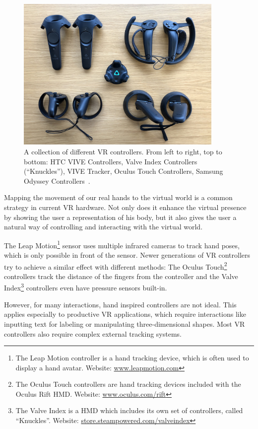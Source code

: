 \begin{figure}[H]%
	\centering%
	\includegraphics[width=10cm]{figures/introduction/vr_controllers.jpg}%
	\caption[Collection of VR controllers]{A collection of different \gls{VR} controllers. From left to right, top to bottom: HTC VIVE Controllers, Valve Index Controllers (\enquote{Knuckles}), VIVE Tracker, Oculus Touch Controllers, Samsung Odyssey Controllers~\cite{Yang.2018}.}\label{fig:vr-controllers}
\end{figure}

Mapping the movement of our real hands to the virtual world is a common strategy in current \gls{VR} hardware. Not only does it enhance the virtual presence by showing the user a representation of his body, but it also gives the user a natural way of controlling and interacting with the virtual world.

The Leap Motion\footnote{The Leap Motion controller is a hand tracking device, which is often used to display a hand avatar. Website: \href{https://www.leapmotion.com/}{www.leapmotion.com}} sensor uses multiple infrared cameras to track hand poses, which is only possible in front of the sensor. Newer generations of \gls{VR} controllers try to achieve a similar effect with different methods: The Oculus Touch\footnote{The Oculus Touch controllers are hand tracking devices included with the Oculus Rift \gls{HMD}. Website: \href{https://www.oculus.com/rift/}{www.oculus.com/rift}} controllers track the distance of the fingers from the controller and the Valve Index\footnote{The Valve Index is a \gls{HMD} which includes its own set of controllers, called \enquote{Knuckles}. Website: \href{https://store.steampowered.com/valveindex}{store.steampowered.com/valveindex}} controllers even have pressure sensors built-in.

However, for many interactions, hand inspired controllers are not ideal. This applies especially to productive \gls{VR} applications, which require interactions like inputting text for labeling or manipulating three-dimensional shapes. Most \gls{VR} controllers also require complex external tracking systems.

